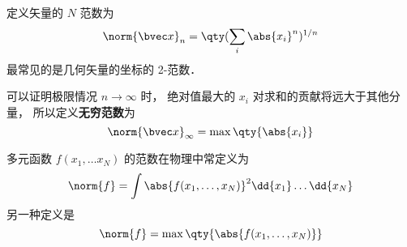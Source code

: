 
定义矢量的 $N$ 范数为
\begin{equation}
\norm{\bvec x}_n = \qty(\sum_i \abs{x_i}^n)^{1/n}
\end{equation}
最常见的是几何矢量的坐标的 2-范数．


可以证明极限情况 $n \to \infty$ 时， 绝对值最大的 $x_i$ 对求和的贡献将远大于其他分量， 所以定义\textbf{无穷范数}为
\begin{equation}
\norm{\bvec x}_\infty = \max \qty{\abs{x_i}}
\end{equation}

多元函数 $f(x_1, \dots x_N)$ 的范数在物理中常定义为
\begin{equation}
\norm{f} = \int \abs{f(x_1, \dots, x_N)}^2 \dd{x_1}\dots \dd{x_N}
\end{equation}
另一种定义是
\begin{equation}
\norm{f} = \max\qty{\abs{f(x_1, \dots, x_N)}}
\end{equation}

